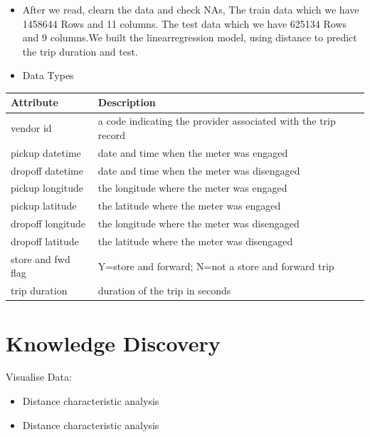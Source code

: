 {
	\begin{itemize}
		\item
		 After we read, clearn the data and check NAs, The train data which we have 1458644 Rows and 11 columns. The test data which we have 625134 Rows and 9 columns.We built the linearregression model, using distance to predict the trip duration and test.
		
		\item
		Data Types
	\end{itemize} 
	
	\bigskip 
	\begin{tabular}{ l | l }
		\toprule
		Attribute     &  Description          \\
		\midrule
		vendor id               & a code indicating the provider associated with the trip record\\
		pickup datetime      &  date and time when the meter was engaged  \\
		dropoff datetime     &  date and time when the meter was disengaged  \\
		pickup longitude     &  the longitude where the meter was engaged\\ 
		pickup latitude        &  the latitude where the meter was engaged\\ 
		dropoff longitude    & the longitude where the meter was disengaged\\ 
		dropoff latitude       & the latitude where the meter was disengaged\\ 
		store and fwd flag   &  Y=store and forward; N=not a store and forward trip\\
		trip duration           & duration of the trip in seconds\\
		
		\bottomrule
	\end{tabular}	
	
}



\section{Knowledge Discovery} 
Visualise Data:

\begin{itemize}
\item
Distance characteristic analysis
\item
Distance characteristic analysis
\end{itemize} 

